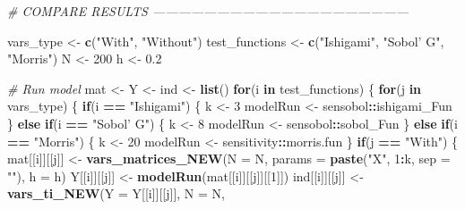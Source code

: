 \documentclass[11pt,]{article}
\newenvironment{Shaded}{\begin{snugshade}}{\end{snugshade}}
\newcommand{\CommentTok}[1]{\textcolor[rgb]{0.56,0.35,0.01}{\textit{#1}}}
\newcommand{\ControlFlowTok}[1]{\textcolor[rgb]{0.13,0.29,0.53}{\textbf{#1}}}
\newcommand{\DataTypeTok}[1]{\textcolor[rgb]{0.13,0.29,0.53}{#1}}
\newcommand{\DecValTok}[1]{\textcolor[rgb]{0.00,0.00,0.81}{#1}}
\newcommand{\FloatTok}[1]{\textcolor[rgb]{0.00,0.00,0.81}{#1}}
\newcommand{\KeywordTok}[1]{\textcolor[rgb]{0.13,0.29,0.53}{\textbf{#1}}}
\newcommand{\NormalTok}[1]{#1}
\newcommand{\OperatorTok}[1]{\textcolor[rgb]{0.81,0.36,0.00}{\textbf{#1}}}
\newcommand{\StringTok}[1]{\textcolor[rgb]{0.31,0.60,0.02}{#1}}
\begin{document}
\begin{Shaded}
\begin{Highlighting}[]
\CommentTok{# COMPARE RESULTS  ------------------------------------------------------------}

\NormalTok{vars_type <-}\StringTok{ }\KeywordTok{c}\NormalTok{(}\StringTok{"With"}\NormalTok{, }\StringTok{"Without"}\NormalTok{)}
\NormalTok{test_functions <-}\StringTok{ }\KeywordTok{c}\NormalTok{(}\StringTok{"Ishigami"}\NormalTok{, }\StringTok{"Sobol' G"}\NormalTok{, }\StringTok{"Morris"}\NormalTok{)}
\NormalTok{N <-}\StringTok{ }\DecValTok{200}
\NormalTok{h <-}\StringTok{ }\FloatTok{0.2}

\CommentTok{# Run model}
\NormalTok{mat <-}\StringTok{ }\NormalTok{Y <-}\StringTok{ }\NormalTok{ind <-}\StringTok{ }\KeywordTok{list}\NormalTok{()}
\ControlFlowTok{for}\NormalTok{(i }\ControlFlowTok{in}\NormalTok{ test_functions) \{}
  \ControlFlowTok{for}\NormalTok{(j }\ControlFlowTok{in}\NormalTok{ vars_type) \{}
    \ControlFlowTok{if}\NormalTok{(i }\OperatorTok{==}\StringTok{ "Ishigami"}\NormalTok{) \{}
\NormalTok{      k <-}\StringTok{ }\DecValTok{3}
\NormalTok{      modelRun <-}\StringTok{ }\NormalTok{sensobol}\OperatorTok{::}\NormalTok{ishigami_Fun}
\NormalTok{    \} }\ControlFlowTok{else} \ControlFlowTok{if}\NormalTok{(i }\OperatorTok{==}\StringTok{ "Sobol' G"}\NormalTok{) \{}
\NormalTok{      k <-}\StringTok{ }\DecValTok{8}
\NormalTok{      modelRun <-}\StringTok{ }\NormalTok{sensobol}\OperatorTok{::}\NormalTok{sobol_Fun}
\NormalTok{    \} }\ControlFlowTok{else} \ControlFlowTok{if}\NormalTok{(i }\OperatorTok{==}\StringTok{ "Morris"}\NormalTok{) \{}
\NormalTok{      k <-}\StringTok{ }\DecValTok{20}
\NormalTok{      modelRun <-}\StringTok{ }\NormalTok{sensitivity}\OperatorTok{::}\NormalTok{morris.fun}
\NormalTok{    \}}
    \ControlFlowTok{if}\NormalTok{(j }\OperatorTok{==}\StringTok{ "With"}\NormalTok{) \{}
\NormalTok{      mat[[i]][[j]] <-}\StringTok{ }\KeywordTok{vars_matrices_NEW}\NormalTok{(}\DataTypeTok{N =}\NormalTok{ N, }
                                         \DataTypeTok{params =} \KeywordTok{paste}\NormalTok{(}\StringTok{"X"}\NormalTok{, }\DecValTok{1}\OperatorTok{:}\NormalTok{k, }\DataTypeTok{sep =} \StringTok{""}\NormalTok{), }
                                         \DataTypeTok{h =}\NormalTok{ h)}
\NormalTok{      Y[[i]][[j]] <-}\StringTok{ }\KeywordTok{modelRun}\NormalTok{(mat[[i]][[j]][[}\DecValTok{1}\NormalTok{]])}
\NormalTok{      ind[[i]][[j]] <-}\StringTok{ }\KeywordTok{vars_ti_NEW}\NormalTok{(}\DataTypeTok{Y =}\NormalTok{ Y[[i]][[j]], }
                                   \DataTypeTok{N =}\NormalTok{ N, }

\end{Highlighting}
\end{Shaded}
\end{document}
